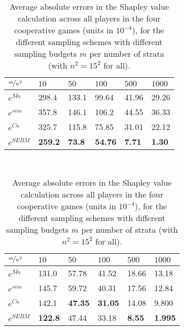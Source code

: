 



\begin{table}[]
    \centering 
    \begin{minipage}[]{0.8\textwidth}
        \centering
        \caption{Airport Game Average Errors}\label{tab1}
			\begin{tabular}{llllll}
			\hline
			$\nicefrac{m}{n^2}$ & $10$ & $50$ & $100$ & $500$ & $1000$ \\
			\hline
			$e^{Ma}$   & 298.4 & 133.1 & 99.64 & 41.96 & 29.26 \\
			$e^{sim}$  & 357.8 & 146.1 & 106.2 & 44.55 & 36.33 \\
			$e^{Ca}$   & 325.7 & 115.8 & 75.85 & 31.01 & 22.12 \\
			$e^{SEBM}$ & \textbf{259.2} & \textbf{73.8} & \textbf{54.76} & \textbf{7.71} & \textbf{1.30}  \\
			\hline
			\end{tabular}
    \end{minipage}
	\\\vspace{4mm}
    \begin{minipage}[]{0.8\textwidth}
        \centering
        \caption{Voting Game Average Errors}\label{tab2}
			\begin{tabular}{llllll}
			\hline
			$\nicefrac{m}{n^2}$ & $10$ & $50$ & $100$ & $500$ & $1000$ \\
			\hline
			$e^{Ma}$    & 131.0 & 57.78 & 41.52 & 18.66 & 13.18 \\
			$e^{sim}$   & 145.7 & 59.72 & 40.31 & 17.56 & 12.84 \\
			$e^{Ca}$    & 142.1 & \textbf{47.35} & \textbf{31.05} & 14.08 & 9.800 \\
			$e^{SEBM}$  & \textbf{122.8} & 47.44 & 33.18 & \textbf{8.55} & \textbf{1.995}  \\
			\hline
			\end{tabular}
    \end{minipage}
    \caption[Average errors approximating the Shapley Value across games and methods]{Average absolute errors in the Shapley value calculation across all players in the four cooperative games (units in $10^{-4}$), for the different sampling schemes with different sampling budgets $m$ per number of strata (with $n^2=15^2$ for all).}
    \label{Table2}
\end{table}
